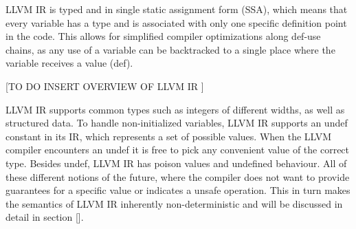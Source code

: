 LLVM IR is typed and in single static assignment form (SSA), which means that every variable has a type and is associated with only one specific definition point in the code. This allows for simplified compiler optimizations along def-use chains, as any use of a variable can be backtracked to a single place where the variable receives a value (def). 

[TO DO INSERT OVERVIEW OF LLVM IR ]

LLVM IR supports common types such as integers of different widths, as well as structured data. To handle non-initialized variables, LLVM IR supports an undef constant in its IR, which represents a set of possible values. When the LLVM compiler encounters an undef it is free to pick any convenient value of the correct type. Besides undef, LLVM IR  has poison values and undefined behaviour. All of these different notions of the future, where the compiler does not want to provide guarantees for a specific value or indicates a unsafe operation. This in turn makes the semantics of LLVM IR inherently non-deterministic and will be discussed in detail in section []. 